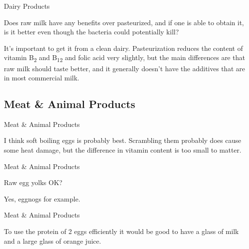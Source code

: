 \documentclass[11pt,oneside,openany,extrafontsizes]{memoir}
\begin{document}
\begin{qaexchange}{Dairy Products}

    \begin{question}
        Does raw milk have any benefits over pasteurized, and if one is able to obtain it, is it better even though the bacteria could potentially kill?
    \end{question}

    \begin{answer}
      It's important to get it from a clean dairy. Pasteurization reduces the content of vitamin B\textsubscript{2} and B\textsubscript{12} and folic acid very slightly, but the main differences are that raw milk should taste better, and it generally doesn't have the additives that are in most commercial milk.
    \end{answer}
\end{qaexchange}

\subsection{Meat \& Animal Products}

\begin{standalonequote}{Meat \& Animal Products}

    \begin{answer}
        I think soft boiling eggs is probably best. Scrambling them probably does cause some heat damage, but the difference in vitamin content is too small to matter.
    \end{answer}
\end{standalonequote}

\begin{qaexchange}{Meat \& Animal Products}

    \begin{question}
        Raw egg yolks OK?
    \end{question}

    \begin{answer}
        Yes, eggnogs for example.
    \end{answer}
\end{qaexchange}

\begin{standalonequote}{Meat \& Animal Products}

    \begin{answer}
        To use the protein of 2 eggs efficiently it would be good to have a glass of milk and a large glass of orange juice.
    \end{answer}
\end{standalonequote}
\end{document}
